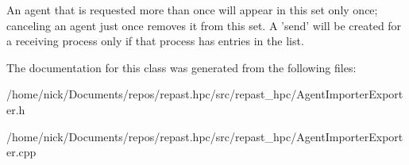 An agent that is requested more than once will appear in this set only once; canceling an agent just once removes it from this set. A 'send' will be created for a receiving process only if that process has entries in the list. 

The documentation for this class was generated from the following files\-:\begin{DoxyCompactItemize}
\item 
/home/nick/\-Documents/repos/repast.\-hpc/src/repast\-\_\-hpc/Agent\-Importer\-Exporter.\-h\item 
/home/nick/\-Documents/repos/repast.\-hpc/src/repast\-\_\-hpc/Agent\-Importer\-Exporter.\-cpp\end{DoxyCompactItemize}
